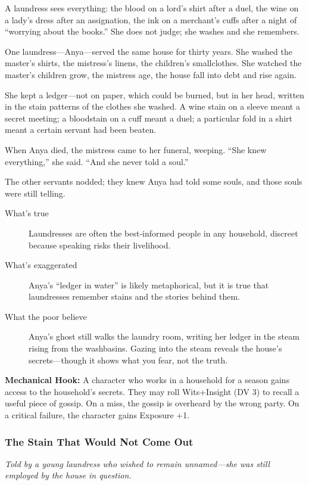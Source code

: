 \documentclass[11pt]{article}
\begin{document}
A laundress sees everything: the blood on a lord's shirt after a duel, the wine on a lady's dress after an assignation, the ink on a merchant's cuffs after a night of “worrying about the books.” She does not judge; she washes and she remembers.

One laundress—Anya—served the same house for thirty years. She washed the master's shirts, the mistress's linens, the children's smallclothes. She watched the master’s children grow, the mistress age, the house fall into debt and rise again.

She kept a ledger—not on paper, which could be burned, but in her head, written in the stain patterns of the clothes she washed. A wine stain on a sleeve meant a secret meeting; a bloodstain on a cuff meant a duel; a particular fold in a shirt meant a certain servant had been beaten.

When Anya died, the mistress came to her funeral, weeping. “She knew everything,” she said. “And she never told a soul.”

The other servants nodded; they knew Anya had told some souls, and those souls were still telling.

\begin{description}
\item[What's true] Laundresses are often the best‑informed people in any household, discreet because speaking risks their livelihood.
\item[What's exaggerated] Anya’s “ledger in water” is likely metaphorical, but it is true that laundresses remember stains and the stories behind them.
\item[What the poor believe] Anya’s ghost still walks the laundry room, writing her ledger in the steam rising from the washbasins. Gazing into the steam reveals the house’s secrets—though it shows what you fear, not the truth.
\end{description}

\textbf{Mechanical Hook:} A character who works in a household for a season gains access to the household’s secrets. They may roll Wits+Insight (DV 3) to recall a useful piece of gossip. On a miss, the gossip is overheard by the wrong party. On a critical failure, the character gains Exposure +1.

\subsubsection{The Stain That Would Not Come Out}
\textit{Told by a young laundress who wished to remain unnamed—she was still employed by the house in question.}
\end{document}
